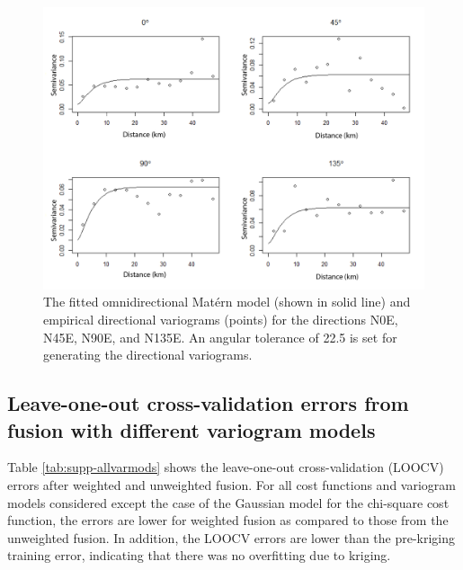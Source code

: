 \documentclass[a4paper,fleqn]{cas-sc}
\begin{document}
    \begin{figure}[htbp!]
    \centering
    \includegraphics[width=\linewidth]{Figures/fig12_variograms-directions.png}
    \caption{The fitted omnidirectional Mat\'ern model (shown in solid line) and empirical directional variograms (points) for the directions N0E, N45E, N90E, and N135E. An angular tolerance of 22.5 is set for generating the directional variograms.}
    \label{fig:vars_direct}
    \end{figure}
  

\subsection{Leave-one-out cross-validation errors from fusion with different variogram models}\label{supp-e}

Table \ref{tab:supp-allvarmods} shows the leave-one-out cross-validation (LOOCV) errors after weighted and unweighted fusion. For all cost functions and variogram models considered except the case of the Gaussian model for the chi-square cost function, the errors are lower for weighted fusion as compared to those from the unweighted fusion. In addition, the LOOCV errors are lower than the pre-kriging training error, indicating that there was no overfitting due to kriging. 
\end{document}
